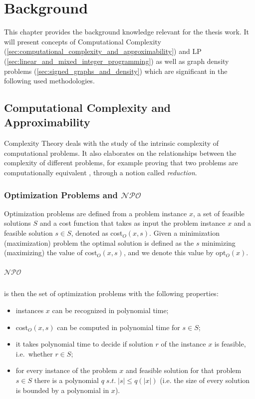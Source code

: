 \chapter{Background}
\label{ch:background}

This chapter provides the background knowledge relevant for the thesis work. It
will present concepts of Computational Complexity
(\autoref{sec:computational_complexity_and_approximability}) and \acrlong{LP}
(\autoref{sec:linear_and_mixed_integer_programming}) as well as graph density problems (\autoref{sec:signed_graphs_and_density}) which are significant in the
following used methodologies.

\section{Computational Complexity and \\Approximability}%
\label{sec:computational_complexity_and_approximability}

Complexity Theory deals with the study of the intrinsic complexity of
computational problems. It also elaborates on the relationships between
the complexity of different problems, for example proving that two problems are
computationally equivalent \cite{9780521884730}, through a notion called
\emph{reduction}.

\subsection{Optimization Problems and $\mathcal{NPO} $}%
\label{sub:optimization_problems}

Optimization problems are defined from a problem instance $x$, a set of
feasible solutions $S$ and a cost function that takes as input the problem
instance $x$ and a feasible solution $s \in S$, denoted as cost$_{O} (x, s) $.
Given a minimization (maximization) problem the optimal solution is defined as
the $s$ minimizing (maximizing) the value of cost$_{O} (x, s)$, and we denote
this value by opt$_{O} (x) $\cite{Trevisan2004}.

\paragraph{$\mathcal{NPO} $}%
\label{par:_npo_}

is then the set of optimization problems with the following properties:
\begin{itemize}
	\item instances $x$ can be recognized in polynomial time;
	\item cost$_{O} (x, s)$ can be computed in polynomial time for $s \in S$;
	\item it takes polynomial time to decide if solution $r$ of the instance
	      $x$ is feasible, i.e.\ whether $r \in S$;
	\item for every instance of the problem $x$
	      and feasible solution for that problem $s \in S$ there is a
	      polynomial $q \; s.t.  \; |s| \leq q(|x|)$ (i.e. the size of every
	      solution is bounded by a polynomial in $x$).
\end{itemize}


